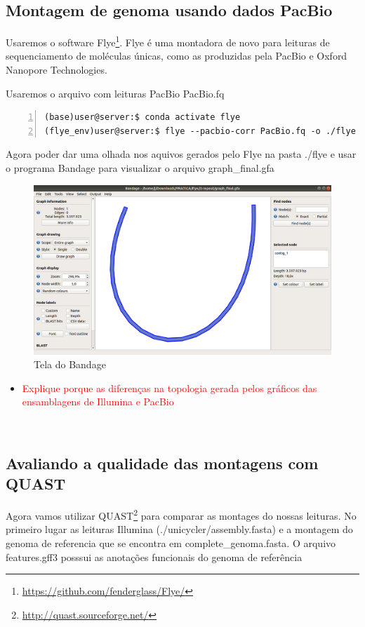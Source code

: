 \documentclass[letter,11pt]{book}
\begin{document}
\subsection{Montagem de genoma usando dados PacBio}
Usaremos o software Flye\footnote{\url{https://github.com/fenderglass/Flye/}}. Flye é uma montadora de novo para leituras de sequenciamento de moléculas únicas, como as produzidas pela PacBio e Oxford Nanopore Technologies.

Usaremos o arquivo com leituras PacBio PacBio.fq

\begin{Verbatim}[commandchars=!\{\}, numbers=left,label= Montando leituras com Flye,frame=topline,fontsize=\scriptsize]
(base)user@server:$ conda activate flye
(flye_env)user@server:$ flye --pacbio-corr PacBio.fq -o ./flye
\end{Verbatim}

Agora poder dar uma olhada nos aquivos gerados pelo Flye na pasta ./flye e usar o programa Bandage para visualizar o arquivo graph\_final.gfa

\begin{figure}[ht]
\centering
   \includegraphics[width=12cm]{Figs/bandage_pacbio.png}
  \caption[Visualização da montagem do flye]{\label{bandage_pacbio}Tela do Bandage}
\end{figure}

\begin{itemize}
\item \textcolor{red}{Explique porque as diferenças na topologia gerada pelos gráficos das ensamblagens de Illumina e PacBio}
\end{itemize}\


\subsection{Avaliando a qualidade das montagens com QUAST}
Agora vamos utilizar QUAST\footnote{\url{http://quast.sourceforge.net/}} para comparar as montages do nossas leituras. No primeiro lugar as leituras Illumina (./unicycler/assembly.fasta) e a montagem do genoma de referencia que se encontra em complete\_genoma.fasta. O arquivo features.gff3 posssui as anotações funcionais do genoma de referência 
\end{document}
